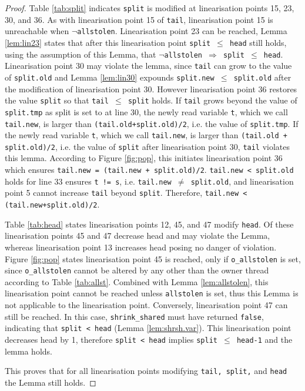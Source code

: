 \documentclass{sig-alternate-br}
\begin{document}
\begin{proof}
	Table \ref{tab:split} indicates \texttt{split} is modified at linearisation points 15, 23, 30, and 36.
	As with linearisation point 15 of \texttt{tail}, linearisation point 15 is unreachable when \texttt{$\neg$allstolen}.
	Linearisation point 23 can be reached, Lemma \ref{lem:lin23} states that after this linearisation point \texttt{split $\leq$ head} still holds, using the assumption of this Lemma, that \texttt{$\neg$allstolen $\Rightarrow$ split $\leq$ head}.
	Linearisation point 30 may violate the lemma, since \texttt{tail} can grow to the value of \texttt{split.old} and Lemma \ref{lem:lin30} expounds \texttt{split.new $\leq$ split.old} after the modification of linearisation point 30.
	However linearisation point 36 restores the value \texttt{split} so that \texttt{tail $\leq$ split} holds.
	If \texttt{tail} grows beyond the value of \texttt{split.tmp} as split is set to at line 30, the newly read variable \texttt{t}, which we call \texttt{tail.new}, is larger than \texttt{(tail.old+split.old)/2}, i.e. the value of \texttt{split.tmp}.
	If the newly read variable \texttt{t}, which we call \texttt{tail.new}, is larger than \texttt{(tail.old + split.old)/2}, i.e. the value of \texttt{split} after linearisation point 30, \texttt{tail} violates this lemma.
	According to Figure \ref{fig:pop}, this initiates linearisation point 36 which ensures \texttt{tail.new = (tail.new + split.old)/2}.
	\texttt{tail.new < split.old} holds for line 33 ensures \texttt{t != s}, i.e. \texttt{tail.new $\neq$ split.old}, and linearisation point 5 cannot increase \texttt{tail} beyond \texttt{split}.
	Therefore, \texttt{tail.new < (tail.new+split.old)/2}.	
	
	Table \ref{tab:head} states linearisation points 12, 45, and 47 modify \texttt{head}.
	Of these linearisation points 45 and 47 decrease head and may violate the Lemma, whereas linearisation point 13 increases head posing no danger of violation.
	Figure \ref{fig:pop} states linearisation point 45 is reached, only if \texttt{o\_allstolen} is set, since \texttt{o\_allstolen} cannot be altered by any other than the owner thread according to Table \ref{tab:allst}.
	Combined with Lemma \ref{lem:allstolen}, this linearisation point cannot be reached unless \texttt{allstolen} is set, thus this Lemma is not applicable to the linearisation point.
	Conversely, linearisation point 47 can still be reached.
	In this case, \texttt{shrink\_shared} must have returned \texttt{false}, indicating that \texttt{split < head} (Lemma \ref{lem:shrsh.var}).
	This linearisation point decreases head by 1, therefore \texttt{split < head} implies \texttt{split $\leq$ head-1} and the lemma holds.
	
	This proves that for all linearisation points modifying \texttt{tail, split,} and \texttt{head} the Lemma still holds.
\end{proof}
\end{document}
